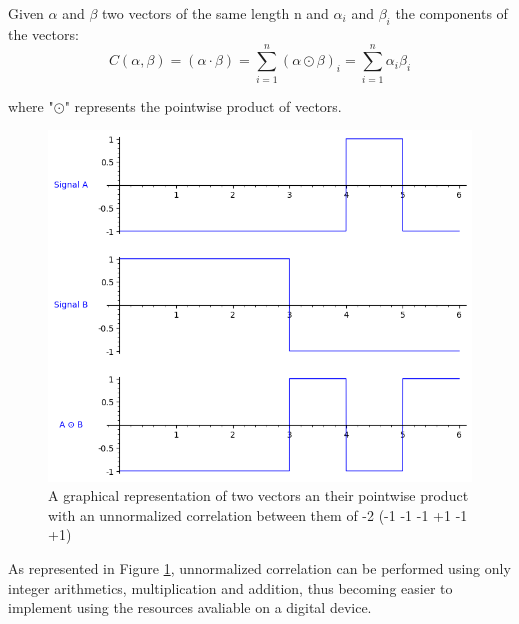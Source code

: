 \begin{definition}\label{def:2}
  Given $\alpha$ and $\beta$ two vectors of the same length n and $\alpha_{i}$
  and $\beta_{i}$ the components of the vectors:
  \begin{equation}\label{eq:2}
    C(\alpha , \beta) = (\alpha \cdot  \beta) = \sum_{i=1}^n(\alpha \odot \beta)_{i}= \sum_{i=1}^{n} \alpha_{i}\beta_{i}
  \end{equation}

  where "$\odot$" represents the pointwise product of vectors.

\end{definition}


\begin{figure}[ht!] %
\begin{center}
\includegraphics[width=0.7\linewidth]{Chapters/Introduction/signals_correlation}
\end{center}
\caption{A graphical representation of two vectors an their pointwise product
with an unnormalized correlation between them of -2 (-1 -1 -1 +1 -1 +1)}
\label{introduction_signals_hadamard}
\end{figure}

As represented in Figure \ref{introduction_signals_hadamard}, unnormalized
correlation can be performed using only integer arithmetics, multiplication
and addition, thus becoming easier to implement using the resources  avaliable
on a digital device.










